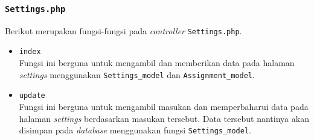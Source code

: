 \subsubsection{\texttt{Settings.php}}
Berikut merupakan fungsi-fungsi pada \textit{controller} \texttt{Settings.php}.
\begin{itemize}
	\item \texttt{index}\\
	Fungsi ini berguna untuk mengambil dan memberikan data pada halaman \textit{settings} menggunakan \texttt{Settings\_model} dan \texttt{Assignment\_model}.
	\item \texttt{update}\\
	Fungsi ini berguna untuk mengambil masukan dan memperbaharui data pada halaman \textit{settings} berdasarkan masukan tersebut. Data tersebut nantinya akan disimpan pada \textit{database} menggunakan fungsi \texttt{Settings\_model}.  
\end{itemize}
